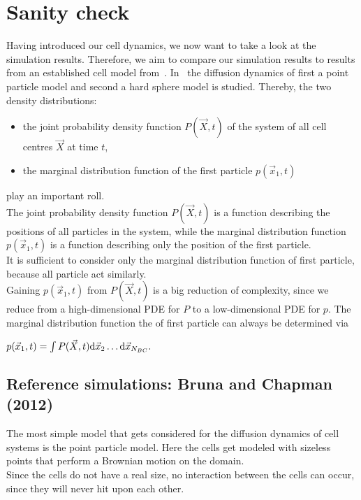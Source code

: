 \section{Sanity check}
Having introduced our cell dynamics, we now want to take a look at the simulation results.
Therefore, we aim to compare our simulation results to results from an established cell model from~\cite{Bruna2012}. 
In~\cite{Bruna2012} the diffusion dynamics of first a point particle model and second a hard sphere model is studied. 
Thereby, the two density distributions:
\begin{itemize}
    \item the joint probability density function $P(\vec{X}, t)$ of the system of all cell centres $\vec{X}$ at time $t$,
    \item the marginal distribution function of the first particle $p(\vec{x}_1, t)$
\end{itemize}
play an important roll. \\
The joint probability density function $P(\vec{X}, t)$ is a function describing the positions of all particles in the system, while the marginal distribution function $p(\vec{x}_1, t)$ is a function describing only the position of the first particle. \\
It is sufficient to consider only the marginal distribution function of first particle, because all particle act similarly. \\ 
Gaining $p(\vec{x}_1, t)$ from $P(\vec{X}, t)$ is a big reduction of complexity, since we reduce from a high-dimensional PDE for $P$ to a low-dimensional PDE for $p$. 
The marginal distribution function the of first particle can always be determined via
\begin{center}
    $
    p(\vec{x}_1, t) = \int P(\vec{X}, t) \mathrm{d} \vec{x}_2 \dots  \mathrm{d} \vec{x}_{N_{BC}}.
    $
\end{center} 

\subsection{Reference simulations: Bruna and Chapman (2012)}
The most simple model that gets considered for the diffusion dynamics of cell systems is the point particle model. 
Here the cells get modeled with sizeless points that perform a Brownian motion on the domain. \\
Since the cells do not have a real size, no interaction between the cells can occur, since they will never hit upon each other.  

